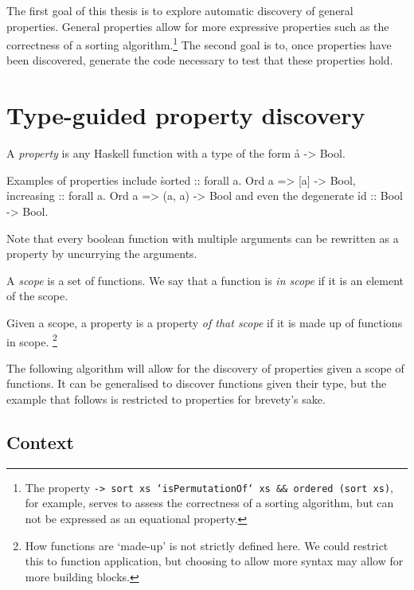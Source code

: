 \documentclass[a4paper, 11pt, onepage]{article}
\begin{document}
The first goal of this thesis is to explore automatic discovery of general properties.
General properties allow for more expressive properties such as the correctness of a sorting algorithm.\footnote{The property \texttt{\xs -> sort xs `isPermutationOf` xs && ordered (sort xs)}, for example, serves to assess the correctness of a sorting algorithm, but can not be expressed as an equational property.}
The second goal is to, once properties have been discovered, generate the code necessary to test that these properties hold.


\section{Type-guided property discovery}

\begin{de}
  A \emph{property} is any Haskell function with a type of the form \h{a -> Bool}.
\end{de}

\begin{ex}
  Examples of properties include \h{sorted :: forall a. Ord a => [a] -> Bool}, \h{increasing :: forall a. Ord a => (a, a) -> Bool} and even the degenerate \h{id :: Bool -> Bool}.

  Note that every boolean function with multiple arguments can be rewritten as a property by uncurrying the arguments.
\end{ex}

\begin{de}
  A \emph{scope} is a set of functions.
  We say that a function is \emph{in scope} if it is an element of the scope.
\end{de}

\begin{de}
  Given a scope, a property is a property \emph{of that scope} if it is made up of functions in scope.
  \footnote{How functions are `made-up' is not strictly defined here. We could restrict this to function application, but choosing to allow more syntax may allow for more building blocks.}
\end{de}

The following algorithm will allow for the discovery of properties given a scope of functions.
It can be generalised to discover functions given their type, but the example that follows is restricted to properties for brevety's sake.


\subsection{Context}
\end{document}
